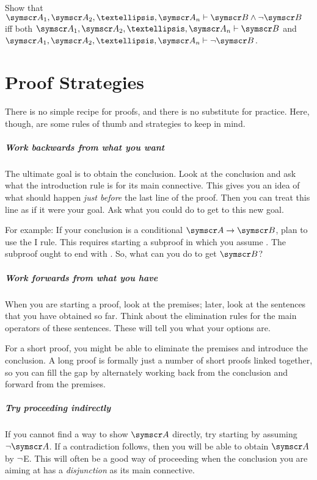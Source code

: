 \problempart Show that $\meta{A}_{1},\meta{A}_{2},…, \meta{A}_{n} \proves \meta{B}\eand\enot\meta{B}$ iff both $\meta{A}_{1},\meta{A}_{2},…, \meta{A}_{n} \proves \meta{B}$ and $\meta{A}_{1},\meta{A}_{2},…, \meta{A}_{n} \proves \enot\meta{B}$.



\chapter{Proof Strategies}\label{c:proof.strat}
There is no simple recipe for proofs, and there is no substitute for practice. Here, though, are some rules of thumb and strategies to keep in mind.




\paragraph{Work backwards from what you want}
The ultimate goal is to obtain the conclusion. Look at the conclusion and ask what the introduction rule is for its main connective. This gives you an idea of what should happen \emph{just before} the last line of the proof. Then you can treat this line as if it were your goal. Ask what you could do to get to this new goal.

For example: If your conclusion is a conditional $\meta{A}\eif\meta{B}$, plan to use the {\eif}I rule. This requires starting a subproof in which you assume . The subproof ought to end with . So, what can you do to get $\meta{B}$?


\paragraph{Work forwards from what you have}
When you are starting a proof, look at the premises; later, look at the sentences that you have obtained so far. Think about the elimination rules for the main operators of these sentences. These will tell you what your options are.

For a short proof, you might be able to eliminate the premises and introduce the conclusion. A long proof is formally just a number of short proofs linked together, so you can fill the gap by alternately working back from the conclusion and forward from the premises.

\paragraph{Try proceeding indirectly}
If you cannot find a way to show $\meta{A}$ directly, try starting by assuming $\enot \meta{A}$. If a contradiction follows, then you will be able to obtain $\meta{A}$ by $\neg$E. This will often be a good way of proceeding when the conclusion you are aiming at has a \emph{disjunction} as its main connective.  

